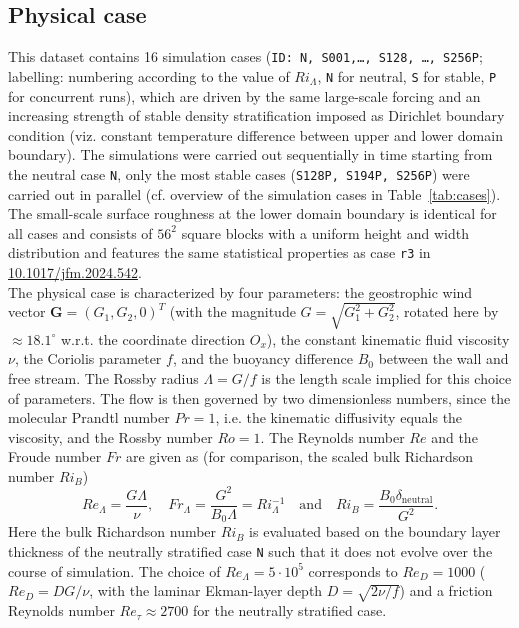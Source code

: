 \documentclass[11pt]{article}
\newcommand{\printdoi}[1]{\href{https://dx.doi.org/#1}{#1}}
\begin{document}
\subsection{Physical case}
This dataset contains 16 simulation cases (\texttt{ID: N, S001,\dots, S128, \dots, S256P}; labelling: numbering according to the value of $Ri_\Lambda$, \texttt{N} for neutral, \texttt{S} for stable, \texttt{P} for concurrent runs), which are driven by the same large-scale forcing and an increasing strength of stable density stratification imposed as Dirichlet boundary condition (viz. constant temperature difference between upper and lower domain boundary). The simulations were carried out sequentially in time starting from the neutral case \texttt{N}, only the most stable cases (\texttt{S128P, S194P, S256P}) were carried out in parallel (cf. overview of the simulation cases in Table~\ref{tab:cases}). 
The small-scale surface roughness at the lower domain boundary is identical for all cases and consists of $56^2$ square blocks with a uniform height and width distribution and features the same statistical properties as case \texttt{r3} in \printdoi{10.1017/jfm.2024.542}.\\
%
The physical case is characterized by four parameters: the geostrophic wind vector \linebreak $\mathbf{G}=\left(G_1,G_2,0\right)^T$ (with the magnitude $G=\sqrt{G_1^2+G_2^2}$, rotated here by $\approx18.1^\circ$ w.r.t. the coordinate direction $O_x$), the constant kinematic fluid viscosity $\nu$, the Coriolis parameter $f$, and the buoyancy difference $B_0$ between the wall and free stream. The Rossby radius $\Lambda=G/f$ is the length scale implied for this choice of parameters. The flow is then governed by two dimensionless numbers, since the molecular Prandtl number $Pr=1$, i.e. the kinematic diffusivity equals the viscosity, and the Rossby number $Ro=1$. The Reynolds number $Re$ and the Froude number $Fr$ are given as (for comparison, the scaled bulk Richardson number $Ri_B$) 
%
\begin{equation}
    Re_\Lambda = \frac{G \Lambda}{\nu},\quad
    Fr_\Lambda=\frac{G^2}{B_0 \Lambda}=Ri_\Lambda^{-1}\quad \mathrm{and} \quad
    Ri_{B} = \frac{B_0 \delta_\mathrm{neutral}}{G^2}.
\end{equation}
%
Here the bulk Richardson number $Ri_B$ is evaluated based on the boundary layer thickness of the neutrally stratified case \texttt{N} such that it does not evolve over the course of simulation. The choice of $Re_\Lambda=5\cdot10^5$ corresponds to $Re_D=1000$ ($Re_D=DG/\nu$, with the laminar Ekman-layer depth $D=\sqrt{2\nu/ f}$) and a friction Reynolds number $Re_{\tau} \approx 2700$ for the neutrally stratified case.  
\end{document}
